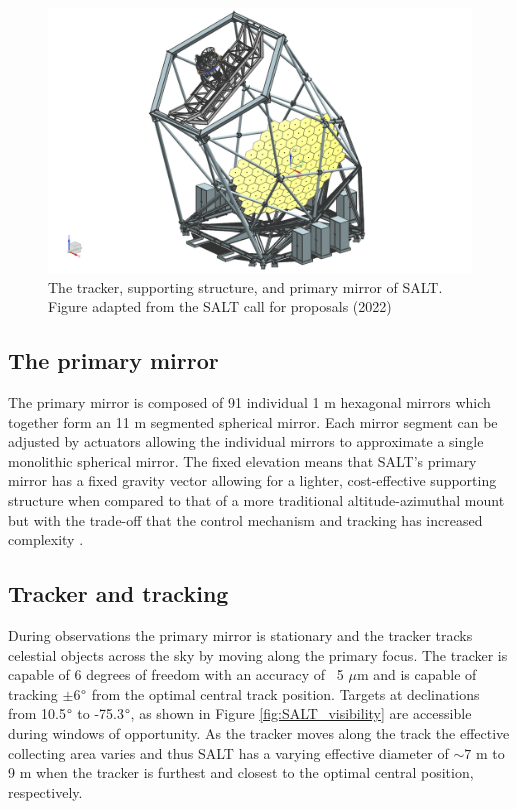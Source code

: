 \begin{figure}[t]
    \centering
    \includegraphics[width = 15cm]{figures/2_SALT_telescope.png}
    \caption{The tracker, supporting structure, and primary mirror of SALT. Figure adapted from the SALT call for proposals (2022)\protect\footnotemark}
    \label{fig:SALT_telescope}
\end{figure}

\subsection{The primary mirror}

The primary mirror is composed of 91 individual 1 m hexagonal mirrors which together form an 11 m segmented spherical mirror. Each mirror segment can be adjusted by actuators allowing the individual mirrors to approximate a single monolithic spherical mirror. The fixed elevation means that SALT's primary mirror has a fixed gravity vector allowing for a lighter, cost-effective supporting structure when compared to that of a more traditional altitude-azimuthal mount but with the trade-off that the control mechanism and tracking has increased complexity \citep{SALT_design}.

\subsection{Tracker and tracking}

During observations the primary mirror is stationary and the tracker tracks celestial objects across the sky by moving along the primary focus. The tracker is capable of 6 degrees of freedom with an accuracy of ~5 $\mu$m and is capable of tracking $\pm$6$\degree$ from the optimal central track position. Targets at declinations from 10.5$\degree$ to -75.3$\degree$, as shown in Figure \ref{fig:SALT_visibility} are accessible during windows of opportunity. As the tracker moves along the track the effective collecting area varies and thus SALT has a varying effective diameter of $\sim7$ m to 9 m when the tracker is furthest and closest to the optimal central position, respectively.
\prgph

